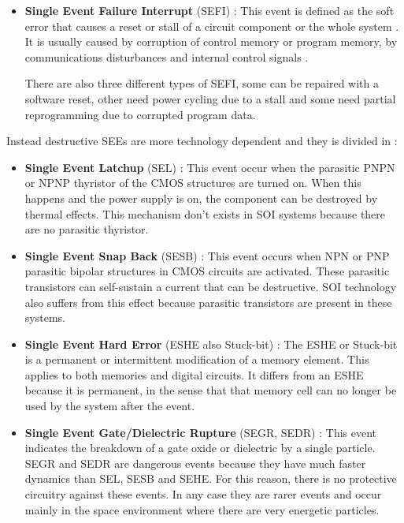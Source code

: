 {{{{{\begin{itemize}
						\item \textbf{Single Event Failure Interrupt} (SEFI) : This event is defined as the soft error that causes a reset or stall of a circuit component or the whole system . It is usually caused by corruption of control memory or program memory, by communications disturbances and internal control signals .
						
						There are also three different types of SEFI, some can be repaired with a software reset, other need power cycling due to a stall and some need partial reprogramming due to corrupted program data.
						
					\end{itemize}
					
					
					
					
					Instead destructive SEEs are more technology dependent and they is divided in :
					\begin{itemize}
						\item \textbf{Single Event Latchup} (SEL) : This event occur when the parasitic PNPN or NPNP thyristor of the CMOS structures are turned on. When this happens and the power supply is on, the component can be destroyed by thermal effects. This mechanism don't exists in SOI systems because there are no parasitic thyristor.
						
						\item \textbf{Single Event Snap Back} (SESB) : This event occurs when NPN or PNP parasitic bipolar structures in CMOS circuits are activated. These parasitic transistors can self-sustain a current that can be destructive. SOI technology also suffers from this effect because parasitic transistors are present in these systems. 
						
						\item \textbf{Single Event Hard Error} (ESHE also Stuck-bit) : The ESHE or Stuck-bit is a permanent or intermittent modification of a memory element. This applies to both memories and digital circuits. It differs from an ESHE because it is permanent, in the sense that that memory cell can no longer be used by the system after the event.
						
						\item \textbf{Single Event Gate/Dielectric Rupture} (SEGR, SEDR) : This event indicates the breakdown of a gate oxide or dielectric by a single particle. SEGR and SEDR are dangerous events because they have much faster dynamics than SEL, SESB and SEHE. For this reason, there is no protective circuitry against these events.  In any case they are rarer events and occur mainly in the space environment where there are very energetic particles. 
					\end{itemize} 
					
}}}}}

